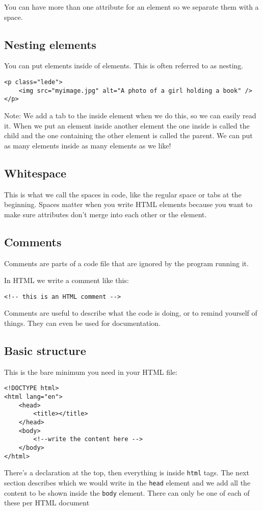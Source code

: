 You can have more than one attribute for an element so we separate them with a space.

\subsection{Nesting elements}

You can put elements inside of elements. This is often referred to as nesting.

\begin{verbatim}
<p class="lede">
    <img src="myimage.jpg" alt="A photo of a girl holding a book" />
</p>
\end{verbatim}

Note:
We add a tab to the inside element when we do this, so we can easily read it.
When we put an element inside another element the one inside is called the child and the one containing the other element is called the parent.
We can put as many elements inside as many elements as we like!

\subsection{Whitespace}

This is what we call the spaces in code, like the regular space or tabs at the beginning.
Spaces matter when you write HTML elements because you want to make sure attributes don't merge into each other or the element.

\subsection{Comments}

Comments are parts of a code file that are ignored by the program running it.

In HTML we write a comment like this:

\begin{verbatim}
<!-- this is an HTML comment -->
\end{verbatim}

Comments are useful to describe what the code is doing, or to remind yourself of things. They can even be used for documentation.

\subsection{Basic structure}

This is the bare minimum you need in your HTML file:

\begin{verbatim}
<!DOCTYPE html>
<html lang="en">
    <head>
        <title></title>
    </head>
    <body>
        <!--write the content here -->
    </body>
</html>
\end{verbatim}

There's a declaration at the top, then everything is inside \texttt{html} tags. The next section describes which we would write in the \texttt{head} element and we add all the content to be shown inside the \texttt{body} element. There can only be one of each of these per HTML document

